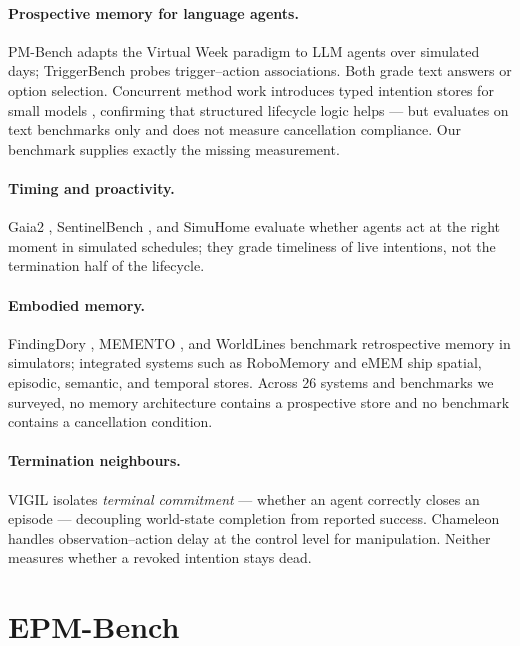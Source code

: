 \documentclass[10pt]{article}
\begin{document}
\paragraph{Prospective memory for language agents.}
PM-Bench \citep{pmbench} adapts the Virtual Week paradigm to LLM agents over
simulated days; TriggerBench \citep{triggerbench} probes trigger--action
associations. Both grade text answers or option selection. Concurrent method
work introduces typed intention stores for small models
\citep{pis2026}, confirming that structured lifecycle logic helps --- but
evaluates on text benchmarks only and does not measure cancellation
compliance. Our benchmark supplies exactly the missing measurement.

\paragraph{Timing and proactivity.}
Gaia2 \citep{gaia2}, SentinelBench \citep{sentinel}, and SimuHome
\citep{simuhome} evaluate whether agents act at the right moment in simulated
schedules; they grade timeliness of live intentions, not the termination half
of the lifecycle.

\paragraph{Embodied memory.}
FindingDory \citep{findingdory}, MEMENTO \citep{memento}, and WorldLines
\citep{worldlines} benchmark retrospective memory in simulators; integrated
systems such as RoboMemory \citep{robomemory} and eMEM \citep{emem} ship
spatial, episodic, semantic, and temporal stores. Across 26 systems and
benchmarks we surveyed, no memory architecture contains a prospective store and
no benchmark contains a cancellation condition.

\paragraph{Termination neighbours.}
VIGIL \citep{vigil} isolates \emph{terminal commitment} --- whether an agent
correctly closes an episode --- decoupling world-state completion from reported
success. Chameleon \citep{chameleon} handles observation--action delay at the
control level for manipulation. Neither measures whether a revoked intention
stays dead.

\section{EPM-Bench}\label{sec:bench}
\end{document}
